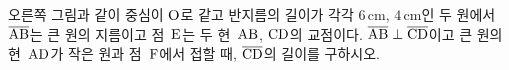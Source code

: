 \noindent\begin{minipage}[t]{0.58\linewidth}\vspace{0pt}\raggedright 오른쪽 그림과 같이 중심이 $\mathrm{O}$로 같고 반지름의 길이가 각각 $6\,\mathrm{cm}$, $4\,\mathrm{cm}$인 두 원에서 $\overline{\mathrm{AB}}$는 큰 원의 지름이고 점~$\mathrm{E}$는 두 현~$\mathrm{AB}$, $\mathrm{CD}$의 교점이다. $\overline{\mathrm{AB}}\perp\overline{\mathrm{CD}}$이고 큰 원의 현~$\mathrm{AD}$가 작은 원과 점~$\mathrm{F}$에서 접할 때, $\overline{\mathrm{CD}}$의 길이를 구하시오.\end{minipage}\hfill\begin{minipage}[t]{0.4\linewidth}\vspace{0pt}\centering \resizebox{\ifdim\width>\linewidth\linewidth\else\width\fi}{!}{}\end{minipage}\par
